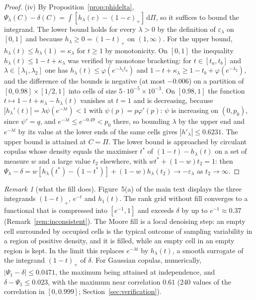 \documentclass[11pt,a4paper]{article}
\theoremstyle{definition}
\theoremstyle{remark}
\newtheorem{remark}[theorem]{Remark}
\begin{document}
\begin{proof}
(iv) By Proposition~\ref{prop:phidelta}, $\Psi_\lambda(C)-\delta(C)=\int[h_\lambda(c)-(1-c)_+]\,\mathrm d\Pi$, so it suffices to bound the integrand. The lower bound holds for every $\lambda>0$ by the definition of $\varepsilon_\lambda$ on $[0,1]$ and because $h_\lambda\ge0=(1-t)_+$ on $(1,\infty)$. For the upper bound, $h_\lambda(t)\le h_\lambda(1)=\kappa_\lambda$ for $t\ge1$ by monotonicity. On $[0,1]$ the inequality $h_\lambda(t)\le1-t+\kappa_\lambda$ was verified by monotone bracketing: for $t\in[t_a,t_b]$ and $\lambda\in[\lambda_1,\lambda_2]$ one has $h_\lambda(t)\le\varphi(e^{-\lambda_1t_a})$ and $1-t+\kappa_\lambda\ge1-t_b+\varphi(e^{-\lambda_2})$, and the difference of the bounds is negative (at most $-0.006$) on a partition of $[0,0.98]\times[1/2,1]$ into cells of size $5\cdot10^{-5}\times10^{-3}$. On $[0.98,1]$ the function $t\mapsto1-t+\kappa_\lambda-h_\lambda(t)$ vanishes at $t=1$ and is decreasing, because $|h_\lambda'(t)|=\lambda\psi(e^{-\lambda t})<1$ with $\psi(p)=p\varphi'(p)$: $\psi$ is increasing on $(0,p_0)$, since $\psi'=q$, and $e^{-\lambda t}\le e^{-0.49}<p_0$ there, so bounding $\lambda$ by the upper end and $e^{-\lambda t}$ by its value at the lower ends of the same cells gives $|h'_\lambda|\le0.6231$. The upper bound is attained at $C=\Pi$. The lower bound is approached by circulant copulas whose density equals the maximiser $t^\ast$ of $(1-t)-h_\lambda(t)$ on a set of measure $w$ and a large value $t_2$ elsewhere, with $wt^\ast+(1-w)t_2=1$: then $\Psi_\lambda-\delta=w[h_\lambda(t^\ast)-(1-t^\ast)]+(1-w)h_\lambda(t_2)\to-\varepsilon_\lambda$ as $t_2\to\infty$.
\end{proof}

\begin{remark}[what the fill does]\label{rem:fill}
Figure~5(a) of the main text displays the three integrands $(1-t)_+$, $e^{-t}$ and $h_1(t)$. The rank grid without fill converges to a functional that is compressed into $[e^{-1},1]$ and exceeds $\delta$ by up to $e^{-1}\approx0.37$ (Remark~\ref{rem:inconsistent}). The Moore fill is a local denoising step: an empty cell surrounded by occupied cells is the typical outcome of sampling variability in a region of positive density, and it is filled, while an empty cell in an empty region is kept. In the limit this replaces $e^{-\lambda t}$ by $h_\lambda(t)$, a smooth surrogate of the integrand $(1-t)_+$ of $\delta$. For Gaussian copulas, numerically, $|\Psi_1-\delta|\le0.0471$, the maximum being attained at independence, and $\delta-\Psi_1\le0.023$, with the maximum near correlation $0.61$ (240 values of the correlation in $[0,0.999]$; Section~\ref{sec:verification}).
\end{remark}
\end{document}
